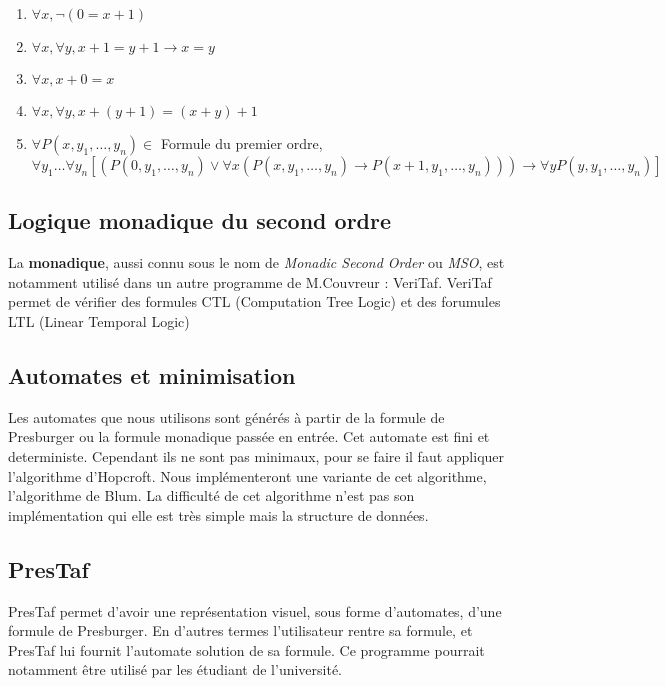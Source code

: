 \documentclass{article}%
\begin{document}
\begin{enumerate}
    \item $\forall x, \neg(0 = x + 1)$
    \item $\forall x, \forall y, x + 1 = y + 1 \rightarrow x = y $
    \item $\forall x, x + 0 = x$
    \item $\forall x, \forall y, x + (y + 1) = (x + y) + 1$
    \item $\forall P(x, y_1, \ldots, y_n) \in$ Formule du premier ordre, 
    $\forall y_1 \ldots \forall y_n [(P(0, y_1, \ldots,y_n) \vee \forall x(P(x, y_1, \ldots, y_n) \rightarrow P(x + 1, y_1, \ldots, y_n))) \rightarrow \forall y P(y, y_1, \ldots, y_n)]$
\end{enumerate}

\subsection{Logique monadique du second ordre}

La \textbf{\gls{monadique}}, aussi connu sous le nom de \emph{Monadic Second Order} ou \emph{MSO}, est notamment utilisé dans un autre programme de M.Couvreur : VeriTaf. VeriTaf permet de vérifier des formules CTL (Computation Tree Logic) et des forumules LTL (Linear Temporal Logic)

\subsection{Automates et minimisation}

Les automates que nous utilisons sont générés à partir de la formule de Presburger ou la formule monadique passée en entrée. Cet automate est fini et deterministe. Cependant ils ne sont pas minimaux, pour se faire il faut appliquer l'algorithme d'Hopcroft\cite{hopcroft1971n}. Nous implémenteront une variante de cet algorithme, l'algorithme de Blum\cite{blum1996nlogn}. La difficulté de cet algorithme n'est pas son implémentation qui elle est très simple mais la structure de données.

\subsection{PresTaf}

PresTaf permet d'avoir une représentation visuel, sous forme d'automates, d'une formule de Presburger. En d'autres termes l'utilisateur rentre sa formule, et PresTaf lui fournit l'automate solution de sa formule. Ce programme pourrait notamment être utilisé par les étudiant de l'université.
\end{document}
